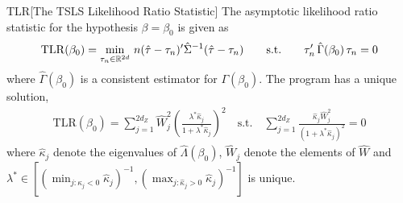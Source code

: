 \begin{propositionp}{TLR}[The TSLS Likelihood Ratio Statistic]\label{prop:tlr}
The asymptotic likelihood ratio statistic for the hypothesis \(\beta=\beta_0\) is given as
\begin{align*}
\mathrm{TLR}(\beta_0) = \min_{\tau_n \in \mathbb{R}^{2d}}\,n(\hat \tau -\tau_n)'\hat\Sigma^{-1}(\hat \tau - \tau_n) \qquad \text{s.t.} \qquad \tau_n'\,\hat\Gamma(\beta_0) \,\tau_n = 0
\end{align*}
where \(\hat\Gamma(\beta_0)\) is a consistent estimator for \(\Gamma(\beta_0)\).
The program has a unique solution,
    \begin{align*}
    \mathrm{TLR}(\beta_0) = \sum_{j=1}^{2d_Z} \hat W_j^2\!\left(\frac{\lambda^*\hat\kappa_j}{1+\lambda^*\hat\kappa_j}\right)^{\!2}
    \quad\text{s.t.}\quad
    \sum_{j=1}^{2d_Z}\frac{\hat\kappa_j \hat W_j^2}{(1+\lambda^*\hat\kappa_j)^2} = 0
\end{align*}
where \(\hat \kappa_j\) denote the eigenvalues of \(\hat \Lambda(\beta_0)\), \(\hat W_j\) denote the elements of \(\hat W\) and \(\lambda^*\in[(\min_{j:\hat\kappa_j<0}\hat\kappa_j)^{-1},(\max_{j:\hat\kappa_j>0}\hat\kappa_j)^{-1}]\) is unique.
\end{propositionp}
